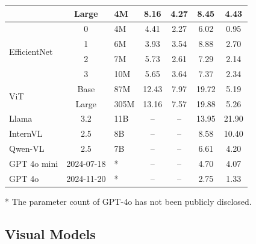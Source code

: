 \begin{table}[ht]
\begin{tabular}{lclcccc}
                                        & Large   &  4M    & 8.16   & 4.27    & 8.45     & 4.43      \\ \midrule
\multirow{4}{*}{EfficientNet}           & 0       &  4M    & 4.41   & 2.27    & 6.02     & 0.95      \\
                                        & 1       &  6M    & 3.93   & 3.54    & 8.88     & 2.70      \\
                                        & 2       &  7M    & 5.73   & 2.61    & 7.29     & 2.14      \\
                                        & 3       &  10M   & 5.65   & 3.64    & 7.37     & 2.34      \\ \midrule
\multirow{2}{*}{\gls{ViT}}              & Base    &  87M   & 12.43  & 7.97    & 19.72    & 5.19      \\
                                        & Large   &  305M  & 13.16  & 7.57    & 19.88    & 5.26      \\ \midrule
Llama                                &  3.2     &     11B   & --     & --      & 13.95    & 21.90     \\
InternVL                             & 2.5      &   8B     & --     & --      & 8.58     & 10.40     \\
Qwen-VL                              & 2.5       &   7B     & --     & --      & 6.61     & 4.20      \\
GPT 4o mini                                 & 2024-07-18    &   *     & --     & --      & 4.70     & 4.07      \\
GPT 4o                                  & 2024-11-20      &    *    & --     & --      & 2.75     & 1.33      \\ \bottomrule

\end{tabular}
\smallskip
\parbox[t]{\textwidth}{\footnotesize
    * The parameter count of GPT-4o has not been publicly disclosed.}
\end{table}


\subsection{Visual Models}
\label{sec:visual_models}

